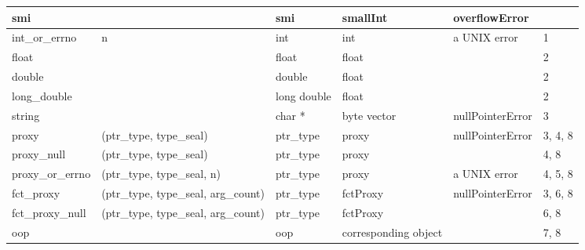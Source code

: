 \documentclass[letterpaper,10pt,english]{sphinxmanual}
\begin{document}
\begin{threeparttable}
\begin{tabulary}{\linewidth}{p{2cm} p{2cm} p{2cm} p{2cm} p{2cm} p{2cm}}
\hline
smi
&&
smi
&
smallInt
&
overflowError
&\\
\hline
int\_or\_errno
&
n
&
int
&
int
&
a UNIX error
&
1
\\
\hline
float
&&
float
&
float
&&
2
\\
\hline
double
&&
double
&
float
&&
2
\\
\hline
long\_double
&&
long double
&
float
&&
2
\\
\hline
string
&&
char *
&
byte vector
&
nullPointerError
&
3
\\
\hline
proxy
&
(ptr\_type, type\_seal)
&
ptr\_type
&
proxy
&
nullPointerError
&
3, 4, 8
\\
\hline
proxy\_null
&
(ptr\_type, type\_seal)
&
ptr\_type
&
proxy
&&
4, 8
\\
\hline
proxy\_or\_errno
&
(ptr\_type, type\_seal, n)
&
ptr\_type
&
proxy
&
a UNIX error
&
4, 5, 8
\\
\hline
fct\_proxy
&
(ptr\_type, type\_seal, arg\_count)
&
ptr\_type
&
fctProxy
&
nullPointerError
&
3, 6, 8
\\
\hline
fct\_proxy\_null
&
(ptr\_type, type\_seal, arg\_count)
&
ptr\_type
&
fctProxy
&&
6, 8
\\
\hline
oop
&&
oop
&
corresponding
object
&&
7, 8
\\
\hline\end{tabulary}

\end{threeparttable}
\end{document}
